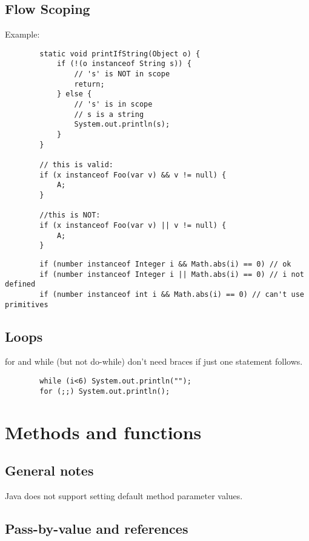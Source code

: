 \documentclass{scrartcl}
\begin{document}
\subsection{Flow Scoping}

    Example:

    \begin{lstlisting}
        static void printIfString(Object o) {
            if (!(o instanceof String s)) {
                // 's' is NOT in scope
                return;
            } else {
                // 's' is in scope
                // s is a string
                System.out.println(s);
            }
        }

        // this is valid:
        if (x instanceof Foo(var v) && v != null) {
            A;
        }

        //this is NOT:
        if (x instanceof Foo(var v) || v != null) {
            A;
        }
    \end{lstlisting}

    \begin{lstlisting}
        if (number instanceof Integer i && Math.abs(i) == 0) // ok
        if (number instanceof Integer i || Math.abs(i) == 0) // i not defined
        if (number instanceof int i && Math.abs(i) == 0) // can't use primitives
    \end{lstlisting}

\subsection{Loops}

    for and while (but not do-while) don't need braces if just one statement follows.

    \begin{lstlisting}
        while (i<6) System.out.println("");
        for (;;) System.out.println();
    \end{lstlisting}

\section{Methods and functions}
\subsection{General notes}

    Java does not support setting default method parameter values.

\subsection{Pass-by-value and references}
\end{document}
